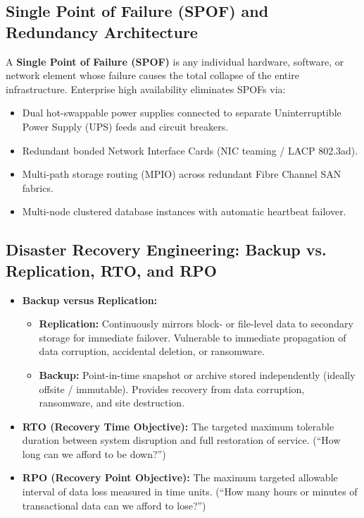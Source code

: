 \subsection{Single Point of Failure (SPOF) and Redundancy Architecture}
A \textbf{Single Point of Failure (SPOF)} is any individual hardware, software, or network element whose failure causes the total collapse of the entire infrastructure. Enterprise high availability eliminates SPOFs via:
\begin{itemize}
    \item Dual hot-swappable power supplies connected to separate Uninterruptible Power Supply (UPS) feeds and circuit breakers.
    \item Redundant bonded Network Interface Cards (NIC teaming / LACP 802.3ad).
    \item Multi-path storage routing (MPIO) across redundant Fibre Channel SAN fabrics.
    \item Multi-node clustered database instances with automatic heartbeat failover.
\end{itemize}

\subsection{Disaster Recovery Engineering: Backup vs. Replication, RTO, and RPO}
\begin{itemize}
    \item \textbf{Backup versus Replication:}
    \begin{itemize}
        \item \textbf{Replication:} Continuously mirrors block- or file-level data to secondary storage for immediate failover. Vulnerable to immediate propagation of data corruption, accidental deletion, or ransomware.
        \item \textbf{Backup:} Point-in-time snapshot or archive stored independently (ideally offsite / immutable). Provides recovery from data corruption, ransomware, and site destruction.
    \end{itemize}
    \item \textbf{RTO (Recovery Time Objective):} The targeted maximum tolerable duration between system disruption and full restoration of service. (``How long can we afford to be down?'')
    \item \textbf{RPO (Recovery Point Objective):} The maximum targeted allowable interval of data loss measured in time units. (``How many hours or minutes of transactional data can we afford to lose?'')
\end{itemize}

